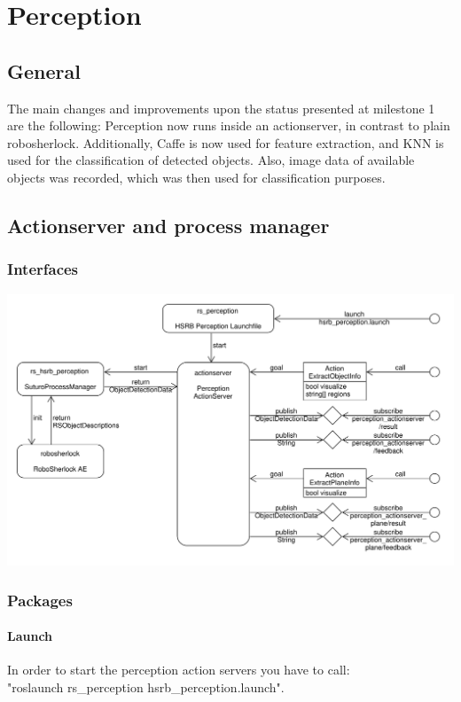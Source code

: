 \documentclass[main.tex]{subfiles}
\begin{document}
	
	\chapter{Perception}
		
		\section{General}
		The main changes and improvements upon the status presented at milestone 1 are the following: Perception now runs inside an actionserver, in contrast to 				plain robosherlock. Additionally, Caffe is now used for feature extraction, and KNN is used for the classification of detected objects. Also, image data of 		available objects was recorded, which was then used for classification purposes.
		
		\section{Actionserver and process manager}
			\subsection{Interfaces}
			\includegraphics[width=\textwidth]{../architecture/perception_architecture/perception.pdf}
			
			\subsection{Packages}
			\subsubsection{Launch}
			In order to start the perception action servers you have to call:\\
			"roslaunch rs\_perception hsrb\_perception.launch".
\end{document}
